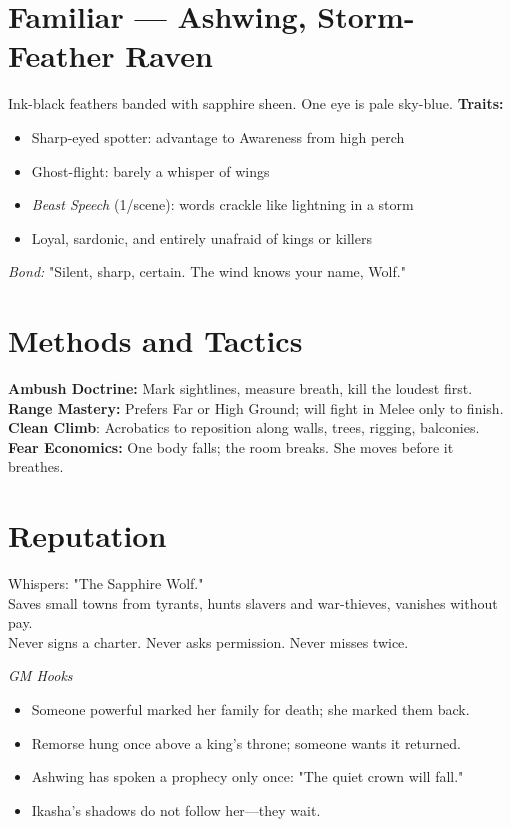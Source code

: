 \documentclass[11pt]{article}
\begin{document}
\section*{Familiar --- Ashwing, Storm-Feather Raven}
Ink-black feathers banded with sapphire sheen. One eye is pale sky-blue.  
\textbf{Traits:}
\begin{itemize}
  \item Sharp-eyed spotter: advantage to Awareness from high perch
  \item Ghost-flight: barely a whisper of wings
  \item \emph{Beast Speech} (1/scene): words crackle like lightning in a storm
  \item Loyal, sardonic, and entirely unafraid of kings or killers
\end{itemize}
\emph{Bond:} "Silent, sharp, certain. The wind knows your name, Wolf."

\section*{Methods and Tactics}
\textbf{Ambush Doctrine:} Mark sightlines, measure breath, kill the loudest first.\\
\textbf{Range Mastery:} Prefers Far or High Ground; will fight in Melee only to finish.\\
\textbf{Clean Climb}: Acrobatics to reposition along walls, trees, rigging, balconies.\\
\textbf{Fear Economics:} One body falls; the room breaks. She moves before it breathes.

\section*{Reputation}
Whispers: "The Sapphire Wolf."\\
Saves small towns from tyrants, hunts slavers and war-thieves, vanishes without pay.\\
Never signs a charter. Never asks permission. Never misses twice.

\bigskip
\noindent\emph{GM Hooks}  
\begin{itemize}
  \item Someone powerful marked her family for death; she marked them back.
  \item Remorse hung once above a king's throne; someone wants it returned.
  \item Ashwing has spoken a prophecy only once: "The quiet crown will fall."
  \item Ikasha's shadows do not follow her---they wait.
\end{itemize}
\end{document}
